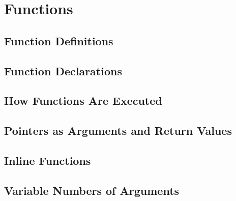 \section{Functions}

\subsection{Function Definitions}
\subsection{Function Declarations}
\subsection{How Functions Are Executed}
\subsection{Pointers as Arguments and Return Values}
\subsection{Inline Functions}
\subsection{Variable Numbers of Arguments}
